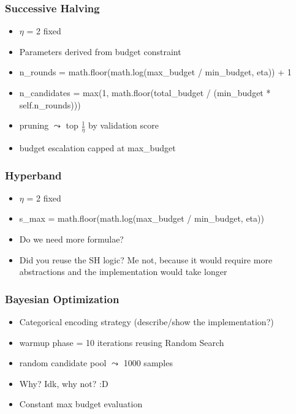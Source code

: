 \documentclass[t,english]{beamer}
\begin{document}
\begin{frame}
  \frametitle{Successive Halving}

  \begin{itemize}[<+->]
    \item $\eta$ = 2 fixed
    \item Parameters derived from budget constraint
    \item n\_rounds = math.floor(math.log(max\_budget / min\_budget, eta)) + 1
    \item n\_candidates = max(1, math.floor(total\_budget / (min\_budget * self.n\_rounds)))
    \item pruning $\leadsto$ top $\frac{1}{\eta}$ by validation score
    \item budget escalation capped at max\_budget
  \end{itemize}

\end{frame}


\begin{frame}
  \frametitle{Hyperband}

  \begin{itemize}[<+->]
    \item $\eta$ = 2 fixed
    \item s\_max = math.floor(math.log(max\_budget / min\_budget, eta))
    \item Do we need more formulae?
    \item Did you reuse the SH logic? Me not, because it would require more abstractions and the implementation would take longer
  \end{itemize}

\end{frame}


\begin{frame}
  \frametitle{Bayesian Optimization}

  \begin{itemize}[<+->]
    \item Categorical encoding strategy (describe/show the implementation?)
    \item warmup phase = 10 iterations reusing Random Search
    \item random candidate pool $\leadsto$ 1000 samples
    \item Why? Idk, why not? :D
    \item Constant max budget evaluation
  \end{itemize}

\end{frame}
\end{document}
